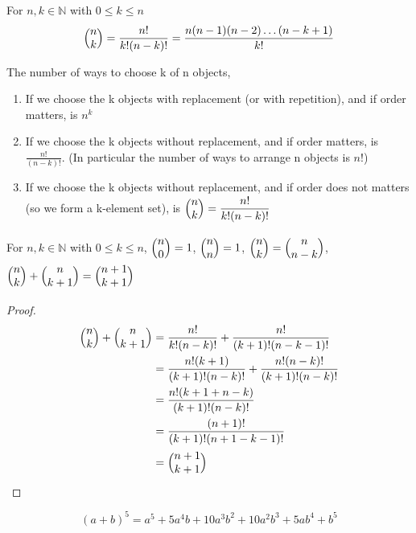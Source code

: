 




\begin{defn}
For $n,k\in\mathbb{N}$ with $0\leq k\leq n$
\[
\mybinom{n}{k} = \frac{n!}{k!(n-k)!} = \frac{n(n-1)(n-2)\dots (n-k+1)}{k!}
\]

\end{defn}


The number of ways to choose k of n objects,

\begin{enumerate}

\item If we choose the k objects with replacement (or with repetition), and if order matters, is $n^k$

\item If we choose the k objects without replacement, and if order matters, is $\displaystyle \frac{n!}{(n-k)!}$. (In particular the number of ways to arrange n objects is $n!$)

\item If we choose the k objects without replacement, and if order does not matters (so we form a k-element set), is $\displaystyle \mybinom{n}{k} = \frac{n!}{k!(n-k)!}$

\end{enumerate}


\begin{note}
For $n,k\in\mathbb{N}$ with $0\leq k \leq n$, $\mybinom{n}{0} = 1$, $\mybinom{n}{n} = 1$, $\mybinom{n}{k} = \mybinom{n}{n-k}$, $\mybinom{n}{k} + \mybinom{n}{k+1} = \mybinom{n+1}{k+1}$
\end{note}

\begin{proof}
\begin{align*}
    \mybinom{n}{k} + \mybinom{n}{k+1} & = \frac{n!}{k!(n-k)!} + \frac{n!}{(k+1)!(n-k-1)!} \\
    & = \frac{n!(k+1)}{(k+1)!(n-k)!} + \frac{n!(n-k)!}{(k+1)!(n-k)!}\\
    & = \frac{n!(k+1+n-k)}{(k+1)!(n-k)!} \\
    & = \frac{(n+1)!}{(k+1)!(n+1 - k - 1)!} \\
    & = \mybinom{n+1}{k+1}
\end{align*}
\end{proof}


\begin{exmp}
\[
(a+b)^5 = a^5 + 5 a^4b + 10 a^3b^2 + 10 a^2b^3 + 5 ab^4 + b^5
\]
\end{exmp}


